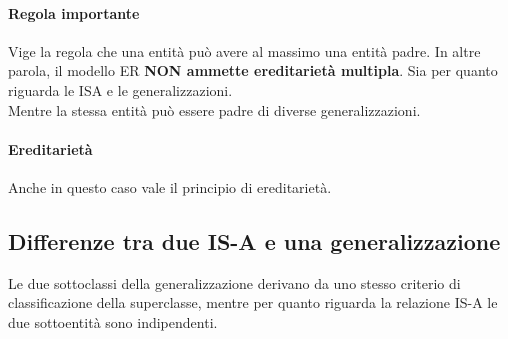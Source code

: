 \paragraph*{Regola importante} Vige la regola che una entità può avere al massimo
una entità padre. In altre parola, il modello ER \textbf{NON ammette ereditarietà multipla}.
Sia per quanto riguarda le ISA e le generalizzazioni.
\\ Mentre la stessa entità può essere padre di diverse generalizzazioni.
\paragraph*{Ereditarietà} Anche in questo caso vale il principio di ereditarietà.
\subsection*{Differenze tra due IS-A e una generalizzazione}
Le due sottoclassi della generalizzazione derivano da uno stesso criterio di
classificazione della superclasse, mentre per quanto riguarda la relazione IS-A
le due sottoentità sono indipendenti.

